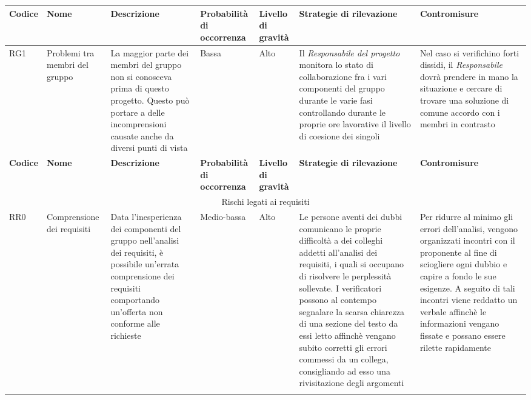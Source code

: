 \documentclass[../PianodiProgetto.tex]{subfiles}
\begin{document}
\begin{longtable}{|p{15mm}|p{23.5mm}|p{38mm}|p{22mm}|p{19mm}|p{30mm}|p{30mm}|}
	\newpage

		\hline \textbf{Codice} & \textbf{Nome} & \textbf{Descrizione} & \textbf{Probabilità di occorrenza} & \textbf{Livello di gravità} & \textbf{Strategie di rilevazione} & \textbf{Contromisure} \\

		\hline RG1 & Problemi tra membri del gruppo & La maggior parte dei membri del gruppo non si conosceva prima di questo progetto. Questo può portare a delle incomprensioni causate anche da diversi punti di vista & Bassa & Alto & Il \textit{Responsabile del progetto} monitora lo stato di collaborazione fra i vari componenti del gruppo durante le varie fasi controllando durante le proprie ore lavorative il livello di coesione dei singoli & Nel caso si verifichino forti dissidi, il \textit{Responsabile} dovrà prendere in mano la situazione e cercare di trovare una soluzione di comune accordo con i membri in contrasto \\ 

		\hline

		\newpage
	
		\hline \textbf{Codice} & \textbf{Nome} & \textbf{Descrizione} & \textbf{Probabilità di occorrenza} & \textbf{Livello di gravità} & \textbf{Strategie di rilevazione} & \textbf{Contromisure} \\

		\hline \multicolumn{7}{|c|}{Rischi legati ai requisiti} \\ 

		\hline  RR0 & Comprensione dei requisiti & Data l'inesperienza dei componenti del gruppo nell'analisi dei requisiti, è possibile un'errata comprensione dei requisiti comportando un'offerta non conforme alle richieste & Medio-bassa & Alto & Le persone aventi dei dubbi comunicano le proprie difficoltà a dei colleghi addetti all'analisi dei requisiti, i quali si occupano di risolvere le perplessità sollevate. I verificatori possono al contempo segnalare la scarsa chiarezza di una sezione del testo da essi letto affinchè vengano subito corretti gli errori commessi da un collega, consigliando ad esso una rivisitazione degli argomenti & Per ridurre al minimo gli errori dell'analisi, vengono organizzati incontri con il proponente al fine di sciogliere ogni dubbio e capire a fondo le sue esigenze. A seguito di tali incontri viene reddatto un verbale affinchè le informazioni vengano fissate e possano essere rilette rapidamente \\ \hline

		\newpage
	

\end{longtable}
\end{document}
